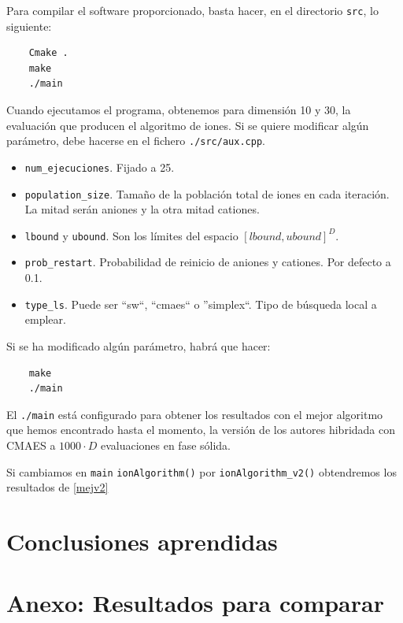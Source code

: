 \documentclass[a4paper,11pt]{article}
\begin{document}
Para compilar el software proporcionado, basta hacer, en el directorio \texttt{src}, lo siguiente:

\begin{verbatim}
    Cmake .
    make
    ./main
\end{verbatim}

Cuando ejecutamos el programa, obtenemos para dimensión 10 y 30, la evaluación que producen el algoritmo de iones.
Si se quiere modificar algún parámetro, debe hacerse en el fichero \texttt{./src/aux.cpp}. 

\begin{itemize}
 \item \texttt{num\_ejecuciones}. Fijado a 25.
 \item \texttt{population\_size}. Tamaño de la población total de iones en cada iteración. La mitad serán aniones y la otra
 mitad cationes.
 \item \texttt{lbound} y \texttt{ubound}. Son los límites del espacio $[lbound, ubound]^D$.
 \item \texttt{prob\_restart}. Probabilidad de reinicio de aniones y cationes. Por defecto a 0.1.
 \item \texttt{type\_ls}. Puede ser ``sw``, ``cmaes`` o ''simplex``. Tipo de búsqueda local a emplear.
\end{itemize}

Si se ha modificado algún parámetro, habrá que hacer:
\begin{verbatim}
    make
    ./main
\end{verbatim}

El \texttt{./main} está configurado para obtener los resultados con el mejor algoritmo que hemos encontrado hasta el momento,
la versión de los autores hibridada con CMAES a $1000\cdot D$ evaluaciones en fase sólida.

Si cambiamos en \texttt{main} \texttt{ionAlgorithm()} por \texttt{ionAlgorithm\_v2()} obtendremos los resultados de \ref{mejv2}



\section{Conclusiones aprendidas}

\section{Anexo: Resultados para comparar}
\end{document}

